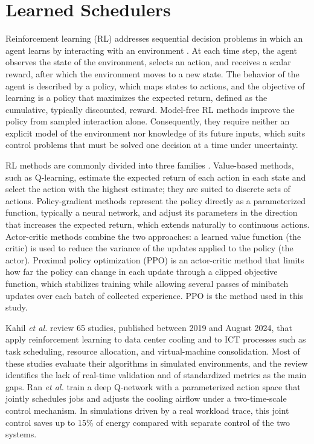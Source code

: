 \documentclass{UNCC-thesis}
\begin{document}
\section{Learned Schedulers}
\label{sec:lit-learned}

Reinforcement learning (RL) addresses sequential decision problems in which an agent learns by
interacting with an environment \cite{sutton2018reinforcement}. At each time step, the agent
observes the state of the environment, selects an action, and receives a scalar reward, after
which the environment moves to a new state. The behavior of the agent is described by a policy,
which maps states to actions, and the objective of learning is a policy that maximizes the
expected return, defined as the cumulative, typically discounted, reward. Model-free RL methods
improve the policy from sampled interaction alone. Consequently, they require neither an
explicit model of the environment nor knowledge of its future inputs, which suits control
problems that must be solved one decision at a time under uncertainty.

RL methods are commonly divided into three families \cite{sutton2018reinforcement}. Value-based
methods, such as Q-learning, estimate the expected return of each action in each state and
select the action with the highest estimate; they are suited to discrete sets of actions.
Policy-gradient methods represent the policy directly as a parameterized function, typically a
neural network, and adjust its parameters in the direction that increases the expected return,
which extends naturally to continuous actions. Actor-critic methods combine the two approaches:
a learned value function (the critic) is used to reduce the variance of the updates applied to
the policy (the actor). Proximal policy optimization (PPO) \cite{schulman2017ppo} is an
actor-critic method that limits how far the policy can change in each update through a clipped
objective function, which stabilizes training while allowing several passes of minibatch
updates over each batch of collected experience. PPO is the method used in this study.

Kahil \emph{et al.} \cite{kahil2025rl} review 65 studies, published between 2019 and August 2024,
that apply reinforcement learning to data center cooling and to ICT processes such as task
scheduling, resource allocation, and virtual-machine consolidation. Most of these studies evaluate
their algorithms in simulated environments, and the review identifies the lack of real-time
validation and of standardized metrics as the main gaps. Ran \emph{et al.} \cite{ran2019deepee}
train a deep Q-network with a parameterized action space that jointly schedules jobs and adjusts
the cooling airflow under a two-time-scale control mechanism. In simulations driven by a real
workload trace, this joint control saves up to 15\% of energy compared with separate control of
the two systems.
\end{document}
